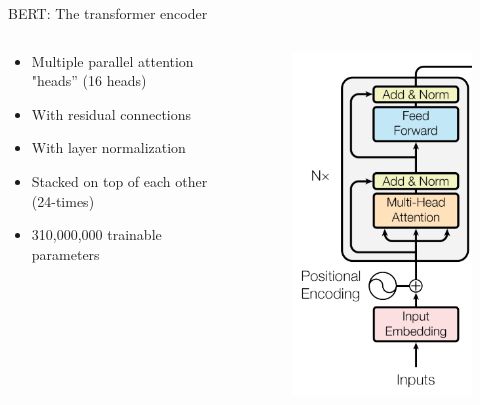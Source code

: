\documentclass[12pt,aspectratio=169,handout]{beamer}
\begin{document}
\begin{frame}{BERT: The transformer encoder}
	
	\begin{columns}
		\begin{column}{0.6\linewidth}
			\begin{itemize}
				\item Multiple parallel attention "heads” (16 heads)
				\item With residual connections
				\item With layer normalization
				\item Stacked on top of each other (24-times)
				\item 310,000,000 trainable parameters
			\end{itemize}
		\end{column}
		\begin{column}{0.3\linewidth}
			\begin{figure}
				\includegraphics[width=\linewidth]{img/transformer.png}

\end{figure}
\end{column}
\end{columns}
\end{frame}
\end{document}
